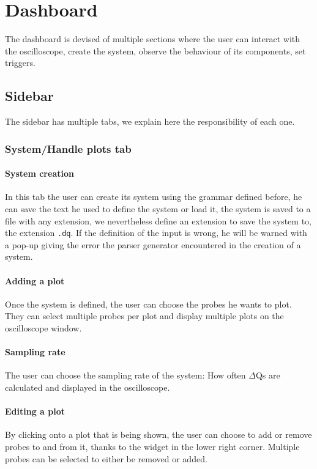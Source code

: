 \section{Dashboard}
    The dashboard is devised of multiple sections where the user can interact with the oscilloscope, create the system, observe the behaviour of its components, set triggers.

    \subsection{Sidebar}
        The sidebar has multiple tabs, we explain here the responsibility of each one.

    \subsubsection{System/Handle plots tab}

    \paragraph{System creation}
        In this tab the user can create its system using the grammar defined before, he can save the text he used to define the system or load it, the system is saved to a file with any extension, we nevertheless define an extension to save the system to, the extension \texttt{.dq}.
        If the definition of the input is wrong, he will be warned with a pop-up giving the error the parser generator encountered in the creation of a system.

    \paragraph{Adding a plot}
        Once the system is defined, the user can choose the probes he wants to plot. They can select multiple probes per plot and display multiple plots on the oscilloscope window.
    
    \paragraph{Sampling rate}
        The user can choose the sampling rate of the system: How often $\Delta$Qs are calculated and displayed in the oscilloscope.

    \paragraph{Editing a plot}
        By clicking onto a plot that is being shown, the user can choose to add or remove probes to and from it, thanks to the widget in the lower right corner. Multiple probes can be selected to either be removed or added.

